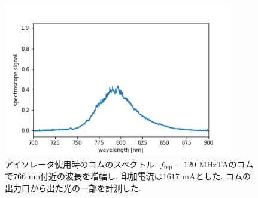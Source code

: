 \documentclass[uplatex, dvipdfmx, a4paper, report, papersize, 11pt]{jsbook}
\begin{document}
\begin{figure}[H]
 \begin{center}
  \includegraphics[width=100mm]{figures/chapter4/comb-spectrum_no-return.png}
\end{center}
 \caption{アイソレータ使用時のコムのスペクトル. $f_{\mathrm{rep}} = 120$ MHzTAのコムで$766$ nm付近の波長を増幅し, 印加電流は$1617$ mAとした. コムの出力口から出た光の一部を計測した. }
 \label{spectrum_current_isolator}
\end{figure}
\end{document}
